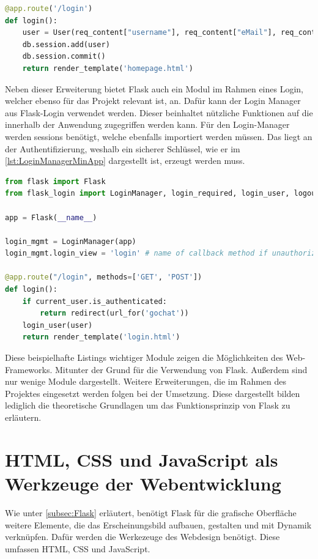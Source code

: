 \documentclass[a4paper,titlepage,halfparskip,12pt]{scrreprt}
\begin{document}
\begin{onehalfspacing}
\begin{lstlisting}[language=Python,caption=Example Listing of Flask-SQLAlchemy,label={lst:SQLAlchemyMinApp}]
@app.route('/login')
def login():
	user = User(req_content["username"], req_content["eMail"], req_content["password"])
	db.session.add(user)
	db.session.commit()
	return render_template('homepage.html')
\end{lstlisting}
Neben dieser Erweiterung bietet Flask auch ein Modul im Rahmen eines Login, welcher ebenso für das Projekt relevant ist, an. Dafür kann der Login Manager aus Flask-Login verwendet werden. Dieser beinhaltet nützliche Funktionen auf die innerhalb der Anwendung zugegriffen werden kann. Für den Login-Manager werden sessions benötigt, welche ebenfalls importiert werden müssen. Das liegt an der Authentifizierung, weshalb ein sicherer Schlüssel, wie er im \autoref{lst:LoginManagerMinApp} dargestellt ist, erzeugt werden muss.
\begin{lstlisting}[language=Python,caption=Example Listing of Flask-Login,label={lst:LoginManagerMinApp}]
from flask import Flask
from flask_login import LoginManager, login_required, login_user, logout_user, current_user

app = Flask(__name__)

login_mgmt = LoginManager(app)
login_mgmt.login_view = 'login' # name of callback method if unauthorized user accessed a login protected site

@app.route("/login", methods=['GET', 'POST'])
def login():
	if current_user.is_authenticated:
		return redirect(url_for('gochat'))
	login_user(user)
	return render_template('login.html')
\end{lstlisting}
Diese beispielhafte Listings wichtiger Module zeigen die Möglichkeiten des Web-Frameworks. Mitunter der Grund für die Verwendung von Flask. Außerdem sind nur wenige Module dargestellt. Weitere Erweiterungen, die im Rahmen des Projektes eingesetzt werden folgen bei der Umsetzung. Diese dargestellt bilden lediglich die theoretische Grundlagen um das Funktionsprinzip von Flask zu erläutern.
\pagebreak

\section{HTML, CSS und JavaScript als Werkzeuge der Webentwicklung}
\label{sec:HTMLCSSJS}
Wie unter \autoref{subsec:Flask} erläutert, benötigt Flask für die grafische Oberfläche weitere Elemente, die das Erscheinungsbild aufbauen, gestalten und mit Dynamik verknüpfen. Dafür werden die Werkezeuge des Webdesign benötigt. Diese umfassen \ac{HTML}, \ac{CSS} und JavaScript.


\end{onehalfspacing}
\end{document}
